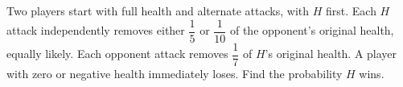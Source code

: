 Two players start with full health and alternate attacks, with $H$ first. Each $H$ attack independently removes either $\dfrac{1}{5}$ or $\dfrac{1}{10}$ of the opponent's original health, equally likely. Each opponent attack removes $\dfrac{1}{7}$ of $H$'s original health. A player with zero or negative health immediately loses. Find the probability $H$ wins.
